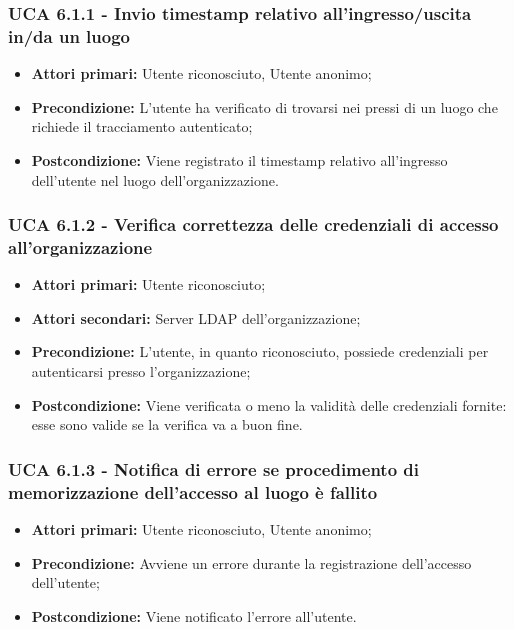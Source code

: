 \subsubsection{UCA 6.1.1 - Invio timestamp relativo all'ingresso/uscita in/da un luogo}%
\begin{itemize}
	\item \textbf{Attori primari:} Utente riconosciuto, Utente anonimo;
	\item \textbf{Precondizione:} L'utente ha verificato di trovarsi nei pressi di un luogo che richiede il tracciamento autenticato;
	\item \textbf{Postcondizione:} Viene registrato il timestamp relativo all'ingresso dell'utente nel luogo dell'organizzazione.
\end{itemize}

\subsubsection{UCA 6.1.2 - Verifica correttezza delle credenziali di accesso all'organizzazione}%
\begin{itemize}
	\item \textbf{Attori primari:} Utente riconosciuto;
	\item \textbf{Attori secondari:} Server LDAP dell'organizzazione;
	\item \textbf{Precondizione:} L'utente, in quanto riconosciuto, possiede credenziali per autenticarsi presso l'organizzazione;
	\item \textbf{Postcondizione:} Viene verificata o meno la validità delle credenziali fornite: esse sono valide se la verifica va a buon fine.
\end{itemize}

\subsubsection{UCA 6.1.3 - Notifica di errore se procedimento di memorizzazione dell'accesso al luogo è fallito}%
\begin{itemize}
	\item \textbf{Attori primari:} Utente riconosciuto, Utente anonimo;
	\item \textbf{Precondizione:} Avviene un errore durante la registrazione dell'accesso dell'utente;
	\item \textbf{Postcondizione:} Viene notificato l'errore all'utente.
\end{itemize}

